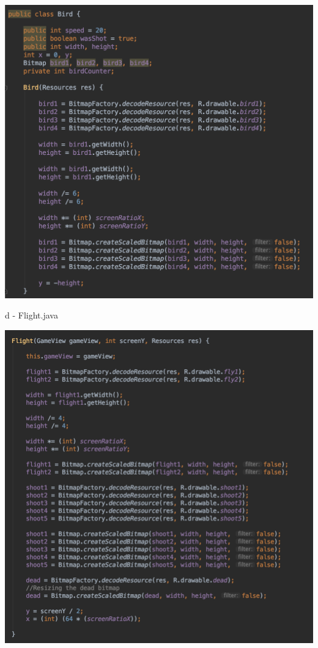 \documentclass{rapportECL}
\begin{document}
\begin{center}
    \includegraphics[scale = 0.5]{logos/Bird.png}
\end{center}

d - Flight.java

\begin{center}
    \includegraphics[scale = 0.5]{logos/Flight.png}
\end{center}
\end{document}
